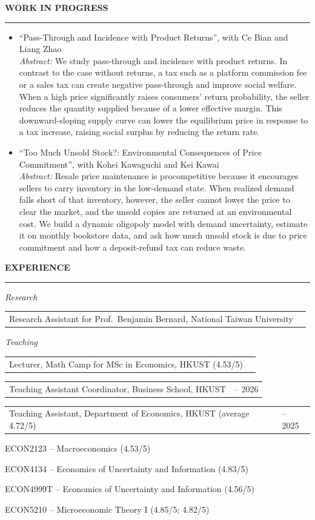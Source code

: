 \documentclass[11pt,letterpaper]{article}
\makeatletter
\newlength{\cvdatecol}
\newcommand{\sectionheader}[1]{%
  \vspace{0.55em}
  {\large\bfseries #1}\\[-0.15em]
  \rule{\textwidth}{0.4pt}\par
  \vspace{0.25em}
}
\newcommand{\cvline}[3][0em]{%
  \par\nobreak
  \noindent\hspace*{#1}%
  \begin{tabularx}{\dimexpr\textwidth-#1\relax}{@{}X@{\hspace{0.75em}}>{\raggedleft\arraybackslash}p{\cvdatecol}@{}}
  #2 & #3 \\
  \end{tabularx}%
}
\newcommand{\courseline}[1]{%
  \par\addvspace{0.28em}%
  \noindent\hspace*{3.2em}#1\par
}
\makeatother
\begin{document}
\sectionheader{WORK IN PROGRESS}
\begin{itemize}
  \item ``Pass-Through and Incidence with Product Returns'', with Ce Bian and Liang Zhao\\[0.2em]
  \textit{Abstract:} We study pass-through and incidence with product returns. In contrast to the case without returns, a tax such as a platform commission fee or a sales tax can create negative pass-through and improve social welfare. When a high price significantly raises consumers' return probability, the seller reduces the quantity supplied because of a lower effective margin. This downward-sloping supply curve can lower the equilibrium price in response to a tax increase, raising social surplus by reducing the return rate.
  \item ``Too Much Unsold Stock?: Environmental Consequences of Price Commitment'', with Kohei Kawaguchi and Kei Kawai\\[0.2em]
  \textit{Abstract:} Resale price maintenance is procompetitive because it encourages sellers to carry inventory in the low-demand state. When realized demand falls short of that inventory, however, the seller cannot lower the price to clear the market, and the unsold copies are returned at an environmental cost. We build a dynamic oligopoly model with demand uncertainty, estimate it on monthly bookstore data, and ask how much unsold stock is due to price commitment and how a deposit-refund tax can reduce waste.
\end{itemize}

\sectionheader{EXPERIENCE}
{
\textit{Research}\\[-0.5em]
\cvline[1.5em]{Research Assistant for Prof.\ Benjamin Bernard, National Taiwan University}{2020}

\vspace{-0.1em}
\textit{Teaching}\\[-0.5em]
\cvline[1.5em]{Lecturer, Math Camp for MSc in Economics, HKUST (4.53/5)}{2026}
\vspace{-0.12em}
\cvline[1.5em]{Teaching Assistant Coordinator, Business School, HKUST}{2025 -- 2026}
\vspace{-0.12em}
\cvline[1.5em]{Teaching Assistant, Department of Economics, HKUST (average 4.72/5)}{2020 -- 2025}
\vspace{0.1em}
\courseline{ECON2123 -- Macroeconomics (4.53/5)}
\courseline{ECON4134 -- Economics of Uncertainty and Information (4.83/5)}
\courseline{ECON4999T -- Economics of Uncertainty and Information (4.56/5)}
\courseline{ECON5210 -- Microeconomic Theory I (4.85/5; 4.82/5)}

}
\end{document}
